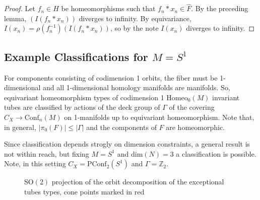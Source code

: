 \documentclass[10pt, oneside]{article}
\newcommand{\Z}{\mathbb{Z}}
\newcommand{\SO}[1][2]{\text{SO}(#1)}
\newcommand{\homeo}[1][S^1]{\text{Homeo}_0(#1)}
\newcommand{\conf}[2][S^1]{\text{Conf}_{#2}(#1)}
\newcommand{\pconf}[2][S^1]{\text{PConf}_{#2}(#1)}
\theoremstyle{definition}
\theoremstyle{definition}
\begin{document}
\begin{proof}
    Let $f_n\in H$ be homeomorphisms such that $f_n*x_n\in \hat{F}$. By the preceding lemma, $(I(f_n*x_n))$ diverges to infinity. By equivariance, $I(x_n) = \rho(f_n^{-1})(I(f_n*x_n))$, so by the note $I(x_n)$ diverges to infinity.
\end{proof}

\subsection{Example Classifications for \texorpdfstring{$M=S^1$}{M=S\string^1}}\label{subsec:example-orbit-bundle-classif}
For components consisting of codimension 1 orbits,
the fiber must be 1-dimensional
and all 1-dimensional homology manifolds are manifolds.
So,
equivariant homeomorphism types of codimension 1 $\homeo[M]$ invariant tubes are classified
by actions of the deck group of $\Gamma$
of the covering $C_X \to \conf[M]{n}$ on 1-manifolds
up to equivariant homeomorphism.
Note that,
in general, $\lvert \pi_0(F) \rvert \leq \lvert \Gamma \rvert$
and the components of $F$ are homeomorphic.

Since classification depends strogly on dimension constraints, a general result is not within reach,
but fixing $M = S^1$
and $\text{dim}(N)=3$ a classification is possible.
Note, in this setting $C_X = \pconf{2}$ and $\Gamma = \Z_2$.

\begin{figure}
    \centering
    
    \caption{$\SO$ projection of the orbit decomposition of the exceptional tubes types, cone points marked in red}
    \label{fig:orbit-bundle-bases}
\end{figure}
\end{document}
